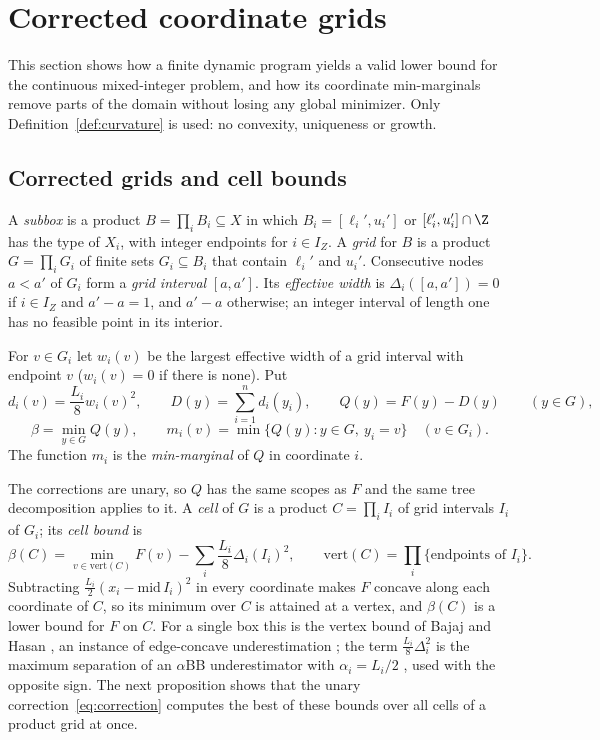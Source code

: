 \section{Corrected coordinate grids}\label{sec:grids}

This section shows how a finite dynamic program yields a valid lower bound
for the continuous mixed-integer problem, and how its coordinate
min-marginals remove parts of the domain without losing any global minimizer.
Only Definition~\ref{def:curvature} is used: no convexity, uniqueness or
growth.

\subsection{Corrected grids and cell bounds}
A \emph{subbox} is a product $B=\prod_iB_i\subseteq X$ in which
$B_i=[\ell_i',u_i']$ or $[\ell_i',u_i']\cap\Z$ has the type of $X_i$, with
integer endpoints for $i\in I_Z$. A \emph{grid} for $B$ is a product
$G=\prod_iG_i$ of finite sets $G_i\subseteq B_i$ that contain $\ell_i'$ and
$u_i'$. Consecutive nodes $a<a'$ of $G_i$ form a \emph{grid interval}
$[a,a']$. Its \emph{effective width} is $\Delta_i([a,a'])=0$ if $i\in I_Z$ and
$a'-a=1$, and $a'-a$ otherwise; an integer interval of length one has no
feasible point in its interior.

\begin{definition}\label{def:corr}
For $v\in G_i$ let $w_i(v)$ be the largest effective width of a grid interval
with endpoint $v$ ($w_i(v)=0$ if there is none). Put
\begin{equation}\label{eq:correction}
d_i(v)=\frac{L_i}{8}w_i(v)^2,\qquad D(y)=\sum_{i=1}^nd_i(y_i),\qquad
Q(y)=F(y)-D(y)\qquad(y\in G),
\end{equation}
\begin{equation}\label{eq:minmarginal}
\beta=\min_{y\in G}Q(y),\qquad m_i(v)=\min\{Q(y):y\in G,\ y_i=v\}\quad(v\in G_i).
\end{equation}
The function $m_i$ is the \emph{min-marginal} of $Q$ in coordinate $i$.
\end{definition}

The corrections are unary, so $Q$ has the same scopes as $F$ and the same
tree decomposition applies to it. A \emph{cell} of $G$ is a product
$C=\prod_iI_i$ of grid intervals $I_i$ of $G_i$; its \emph{cell bound} is
\[
\beta(C)=\min_{v\in\mathrm{vert}(C)}F(v)-\sum_i\frac{L_i}{8}\Delta_i(I_i)^2,
\qquad\mathrm{vert}(C)=\prod_i\{\text{endpoints of }I_i\}.
\]
Subtracting $\frac{L_i}2(x_i-\mathrm{mid}\,I_i)^2$ in every coordinate makes
$F$ concave along each coordinate of $C$, so its minimum over $C$ is attained
at a vertex, and $\beta(C)$ is a lower bound for $F$ on $C$. For a single box
this is the vertex bound of Bajaj and Hasan \cite[Theorem~1]{BajajHasan2020},
an instance of edge-concave underestimation
\cite{Tardella2004,MeyerFloudas2005,Hasan2018}; the term
$\frac{L_i}8\Delta_i^2$ is the maximum separation of an $\alpha$BB
underestimator with $\alpha_i=L_i/2$ \cite{MaranasFloudas1994,AdjimanEtAl1998},
used with the opposite sign. The next proposition shows that the unary
correction~\eqref{eq:correction} computes the best of these bounds over all
cells of a product grid at once.

